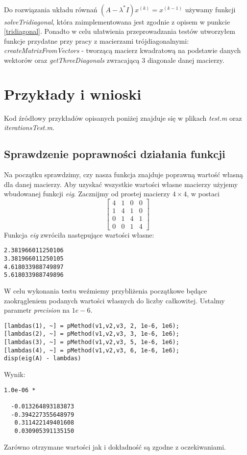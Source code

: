 \documentclass{article}
\begin{document}
\paragraph{}
Do rozwiązania układu równań $(A - \lambda^*I)x^{(k)} = x^{(k-1)}$ używamy funkcji \textit{solveTridiagonal}, która zaimplementowana jest zgodnie z opisem w punkcie \ref{tridiagonal}. Ponadto w celu ułatwienia przeprowadzania testów utworzyłem funkcje przydatne przy pracy z macierzami trójdiagonalnymi: \textit{createMatrixFromVectors} - tworzącą macierz kwadratową na podstawie danych wektorów oraz \textit{getThreeDiagonals} zwracającą 3 diagonale danej macierzy.
\section{Przykłady i wnioski}
\paragraph{}
Kod źródłowy przykładów opisanych poniżej znajduje się w plikach \textit{test.m} oraz \textit{iterationsTest.m}.
\subsection{Sprawdzenie poprawności działania funkcji}
Na początku sprawdzimy, czy nasza funkcja znajduje poprawną wartość własną dla danej macierzy. Aby uzyskać wszystkie wartości własne macierzy użyjemy wbudowanej funkcji \textit{eig}. Zacznijmy od prostej macierzy $4\times 4$, w postaci 
$$
\begin{bmatrix}
4 & 1 & 0 & 0\\
1 & 4 & 1 & 0\\
0 & 1 & 4 & 1\\
0 & 0 & 1 & 4
\end{bmatrix}
$$
Funkcja \textit{eig} zwróciła następujące wartości własne:\\
\begin{lstlisting}[style=Matlab-editor]
2.381966011250106
3.381966011250105
4.618033988749897
5.618033988749896
\end{lstlisting}
\vspace{4pt}
W celu wykonania testu weźmiemy przybliżenia początkowe będące zaokrągleniem podanych wartości własnych do liczby całkowitej. Ustalmy parametr \textit{precision} na $1e-6$. 
\begin{lstlisting}[style=Matlab-editor]
[lambdas(1), ~] = pMethod(v1,v2,v3, 2, 1e-6, 1e6);
[lambdas(2), ~] = pMethod(v1,v2,v3, 3, 1e-6, 1e6);
[lambdas(3), ~] = pMethod(v1,v2,v3, 5, 1e-6, 1e6);
[lambdas(4), ~] = pMethod(v1,v2,v3, 6, 1e-6, 1e6);
disp(eig(A) - lambdas)
\end{lstlisting}
\vspace{4pt}
Wynik:
\begin{lstlisting}[style=Matlab-editor]
   1.0e-06 *

  -0.013264893183873
  -0.394227355648979
   0.311422149401608
   0.030905391135150
\end{lstlisting}
\vspace{4pt}
Zarówno otrzymane wartości jak i dokładność są zgodne z oczekiwaniami.
\end{document}
